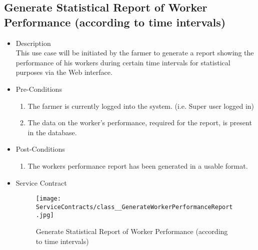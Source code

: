 \documentclass[11pt,fleqn]{book} %
\begin{document}
\subsection{Generate Statistical Report of Worker Performance (according to time intervals)}
\begin{itemize}
	\item Description\\
	This use case will be initiated by the farmer to generate a report showing the performance of his workers during certain time intervals for statistical purposes via the Web interface.
	\item Pre-Conditions
	\begin{enumerate}
		\item The farmer is currently logged into the system. (i.e. Super user logged in)
		\item The data on the worker’s performance, required for the report, is present in the database.		
	\end{enumerate}
	\item Post-Conditions
	\begin{enumerate}
		\item The workers performance report has been generated in a usable format.
	\end{enumerate}
	\item Service Contract
	\begin{figure}
		\texttt{[image: ServiceContracts/class\_\_GenerateWorkerPerformanceReport.jpg]}
		\caption{Generate Statistical Report of Worker Performance (according to time intervals)}
	\end{figure}
\end{itemize}
\end{document}
